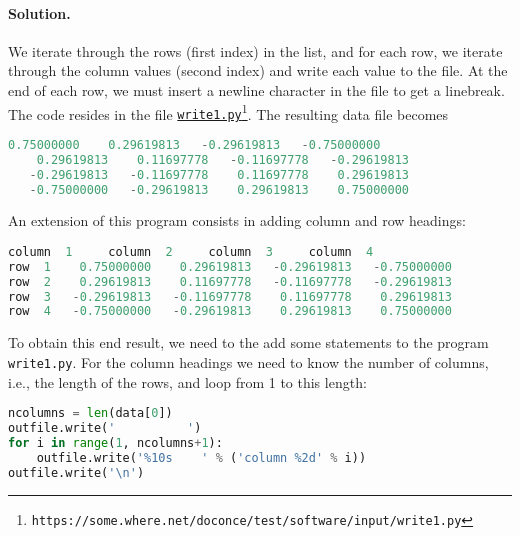 \documentclass[graybox,sectrefs,envcountresetchap,open=right,final]{svmonodo}
\begin{document}
\paragraph{Solution.}
We iterate through the rows (first index) in the list, and for each row,
we iterate through the column values (second index)
and write each value to the file.
At the end of each row, we must insert a newline character in the file to get
a linebreak. The code resides in the file \href{{https://some.where.net/doconce/test/software/input/write1.py}}{\nolinkurl{write1.py}\footnote{\texttt{https://some.where.net/doconce/test/software/input/write1.py}}}.
The resulting data file becomes
\begin{lstlisting}[language=Python,style=simple,xleftmargin=2mm]
    0.75000000    0.29619813   -0.29619813   -0.75000000
    0.29619813    0.11697778   -0.11697778   -0.29619813
   -0.29619813   -0.11697778    0.11697778    0.29619813
   -0.75000000   -0.29619813    0.29619813    0.75000000

\end{lstlisting}

An extension of this program consists in adding column and row headings:
\begin{lstlisting}[language=Python,style=simple,xleftmargin=2mm]
           column  1     column  2     column  3     column  4
row  1    0.75000000    0.29619813   -0.29619813   -0.75000000
row  2    0.29619813    0.11697778   -0.11697778   -0.29619813
row  3   -0.29619813   -0.11697778    0.11697778    0.29619813
row  4   -0.75000000   -0.29619813    0.29619813    0.75000000

\end{lstlisting}

To obtain this end result, we need to the add some statements to
the program \texttt{write1.py}. For the column headings we need
to know the number of columns, i.e., the length of the rows,
and loop from 1 to this length:
\begin{lstlisting}[language=Python,style=simple,xleftmargin=2mm]
ncolumns = len(data[0])
outfile.write('          ')
for i in range(1, ncolumns+1):
    outfile.write('%10s    ' % ('column %2d' % i))
outfile.write('\n')

\end{lstlisting}
\end{document}

